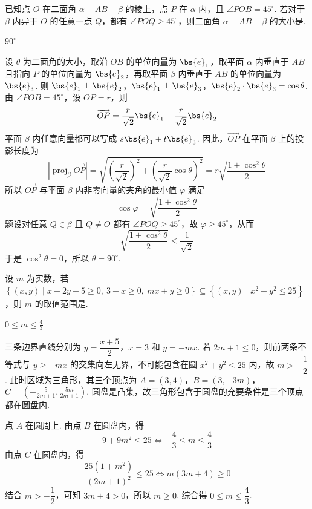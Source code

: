 \begin{problem}
已知点 \(O\) 在二面角 \(\alpha-AB-\beta\) 的棱上，点 \(P\) 在 \(\alpha\) 内，且 \(\angle POB = 45^{\circ}\). 若对于 \(\beta\) 内异于 \(O\) 的任意一点 \(Q\)，都有 \(\angle POQ \geqslant 45^{\circ}\)，则二面角 \(\alpha-AB-\beta\) 的大小是\fillinblank{}.
\begin{answer}
\(90^{\circ}\)
\end{answer}

\begin{solution}
设 \(\theta\) 为二面角的大小，取沿 \(OB\) 的单位向量为 \(\bs{e}_1\)，取平面 \(\alpha\) 内垂直于 \(AB\) 且指向 \(P\) 的单位向量为 \(\bs{e}_2\)，再取平面 \(\beta\) 内垂直于 \(AB\) 的单位向量为 \(\bs{e}_3\). 则
\(\bs{e}_1\perp\bs{e}_2\)，\(\bs{e}_1\perp\bs{e}_3\)，\(\bs{e}_2\cdot\bs{e}_3=\cos\theta\).
由 \(\angle POB=45^{\circ}\)，设 \(OP=r\)，则
\[
\overrightarrow{OP}=\frac r{\sqrt2}\bs{e}_1+\frac r{\sqrt2}\bs{e}_2
\]
平面 \(\beta\) 内任意向量都可以写成 \(s\bs{e}_1+t\bs{e}_3\). 因此，\(\overrightarrow{OP}\) 在平面 \(\beta\) 上的投影长度为
\[
\left\lvert\operatorname{proj}_{\beta}\overrightarrow{OP}\right\rvert
=\sqrt{\left(\frac r{\sqrt2}\right)^2+\left(\frac r{\sqrt2}\cos\theta\right)^2}
=r\sqrt{\frac{1+\cos^2\theta}{2}}
\]
所以 \(\overrightarrow{OP}\) 与平面 \(\beta\) 内非零向量的夹角的最小值 \(\varphi\) 满足
\[
\cos\varphi=\sqrt{\frac{1+\cos^2\theta}{2}}
\]
题设对任意 \(Q\in\beta\) 且 \(Q\ne O\) 都有 \(\angle POQ\geqslant45^{\circ}\)，故 \(\varphi\geqslant45^{\circ}\)，从而
\[
\sqrt{\frac{1+\cos^2\theta}{2}}\leqslant\frac1{\sqrt2}
\]
于是 \(\cos^2\theta=0\)，所以 \(\theta=90^{\circ}\).
\end{solution}
\end{problem}

\begin{problem}
设 \(m\) 为实数，若 \(\left\{(x,y)\mid x - 2y + 5 \geqslant 0,\ 3 - x \geqslant 0,\ mx + y \geqslant 0\right\} \subseteq
\left\{(x,y)\mid x^{2} + y^{2} \leqslant 25\right\}\)，则 \(m\) 的取值范围是\fillinblank{}.
\begin{answer}
\(0 \leqslant m \leqslant \frac{4}{3}\)
\end{answer}

\begin{solution}
三条边界直线分别为 \(y=\dfrac{x+5}{2}\)，\(x=3\) 和 \(y=-mx\). 若 \(2m+1\leqslant0\)，则前两条不等式与 \(y\geqslant-mx\) 的交集向左无界，不可能包含在圆 \(x^2+y^2\leqslant25\) 内，故 \(m>-\dfrac12\). 此时区域为三角形，其三个顶点为
\(A=(3,4)\)，\(B=(3,-3m)\)，\(C=\left(-\frac5{2m+1},\frac{5m}{2m+1}\right)\).
圆盘是凸集，故三角形包含于圆盘的充要条件是三个顶点都在圆盘内.

点 \(A\) 在圆周上. 由点 \(B\) 在圆盘内，得
\[
9+9m^2\leqslant25\Longleftrightarrow-\frac43\leqslant m\leqslant\frac43
\]
由点 \(C\) 在圆盘内，得
\[
\frac{25(1+m^2)}{(2m+1)^2}\leqslant25
\Longleftrightarrow m(3m+4)\geqslant0
\]
结合 \(m>-\dfrac12\)，可知 \(3m+4>0\)，所以 \(m\geqslant0\). 综合得 \(0\leqslant m\leqslant\dfrac43\).
\end{solution}
\end{problem}


